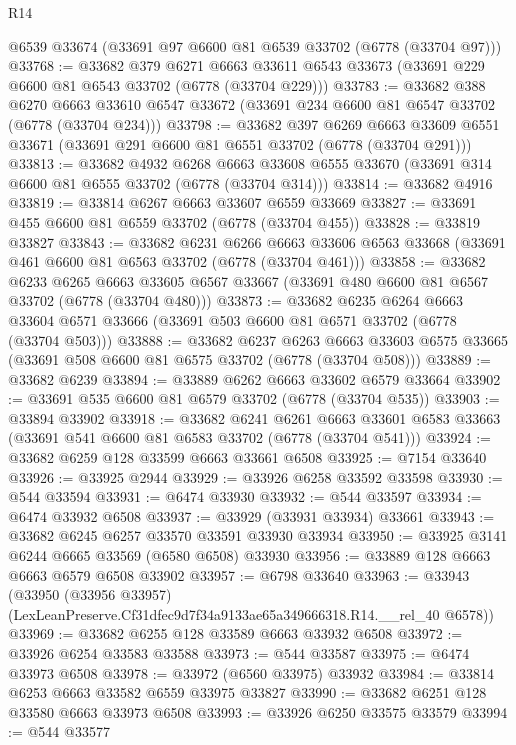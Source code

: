 \begin{lexlean}{R14}
\begin{coremodule}
    @6539
    @33674
    (@33691 @97 @6600 @81 @6539 @33702 (@6778 (@33704 @97)))
@33768 := @33682
    @379
    @6271
    @6663
    @33611
    @6543
    @33673
    (@33691 @229 @6600 @81 @6543 @33702 (@6778 (@33704 @229)))
@33783 := @33682
    @388
    @6270
    @6663
    @33610
    @6547
    @33672
    (@33691 @234 @6600 @81 @6547 @33702 (@6778 (@33704 @234)))
@33798 := @33682
    @397
    @6269
    @6663
    @33609
    @6551
    @33671
    (@33691 @291 @6600 @81 @6551 @33702 (@6778 (@33704 @291)))
@33813 := @33682
    @4932
    @6268
    @6663
    @33608
    @6555
    @33670
    (@33691 @314 @6600 @81 @6555 @33702 (@6778 (@33704 @314)))
@33814 := @33682 @4916
@33819 := @33814 @6267 @6663 @33607 @6559 @33669
@33827 := @33691 @455 @6600 @81 @6559 @33702 (@6778 (@33704 @455))
@33828 := @33819 @33827
@33843 := @33682
    @6231
    @6266
    @6663
    @33606
    @6563
    @33668
    (@33691 @461 @6600 @81 @6563 @33702 (@6778 (@33704 @461)))
@33858 := @33682
    @6233
    @6265
    @6663
    @33605
    @6567
    @33667
    (@33691 @480 @6600 @81 @6567 @33702 (@6778 (@33704 @480)))
@33873 := @33682
    @6235
    @6264
    @6663
    @33604
    @6571
    @33666
    (@33691 @503 @6600 @81 @6571 @33702 (@6778 (@33704 @503)))
@33888 := @33682
    @6237
    @6263
    @6663
    @33603
    @6575
    @33665
    (@33691 @508 @6600 @81 @6575 @33702 (@6778 (@33704 @508)))
@33889 := @33682 @6239
@33894 := @33889 @6262 @6663 @33602 @6579 @33664
@33902 := @33691 @535 @6600 @81 @6579 @33702 (@6778 (@33704 @535))
@33903 := @33894 @33902
@33918 := @33682
    @6241
    @6261
    @6663
    @33601
    @6583
    @33663
    (@33691 @541 @6600 @81 @6583 @33702 (@6778 (@33704 @541)))
@33924 := @33682 @6259 @128 @33599 @6663 @33661 @6508
@33925 := @7154 @33640
@33926 := @33925 @2944
@33929 := @33926 @6258 @33592 @33598
@33930 := @544 @33594
@33931 := @6474 @33930
@33932 := @544 @33597
@33934 := @6474 @33932 @6508
@33937 := @33929 (@33931 @33934) @33661
@33943 := @33682 @6245 @6257 @33570 @33591 @33930 @33934
@33950 := @33925 @3141 @6244 @6665 @33569 (@6580 @6508) @33930
@33956 := @33889 @128 @6663 @6663 @6579 @6508 @33902
@33957 := @6798 @33640
@33963 := @33943
    (@33950 (@33956 @33957) (LexLeanPreserve.Cf31dfec9d7f34a9133ae65a349666318.R14.__rel_40 @6578))
@33969 := @33682 @6255 @128 @33589 @6663 @33932 @6508
@33972 := @33926 @6254 @33583 @33588
@33973 := @544 @33587
@33975 := @6474 @33973 @6508
@33978 := @33972 (@6560 @33975) @33932
@33984 := @33814 @6253 @6663 @33582 @6559 @33975 @33827
@33990 := @33682 @6251 @128 @33580 @6663 @33973 @6508
@33993 := @33926 @6250 @33575 @33579
@33994 := @544 @33577

\end{coremodule}
\end{lexlean}
